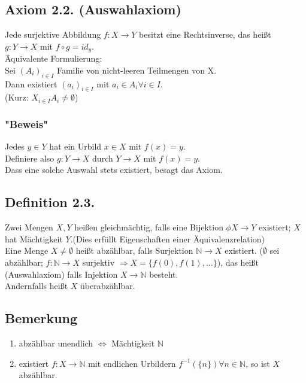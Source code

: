 \documentclass[a4paper,twoside]{article}
\begin{document}
\subsection*{Axiom 2.2. (Auswahlaxiom)}
Jede surjektive Abbildung $f: X \rightarrow Y$ besitzt eine Rechtsinverse, das heißt \\
$g: Y \rightarrow X$ mit $f \circ g = id_y$.\\
Äquivalente Formulierung:\\
Sei $(A_i)_{i \in I}$ Familie von nicht-leeren Teilmengen von X.\\
Dann existiert $(a_i)_{i \in I}$ mit $a_i \in A_i \forall i \in I$.\\
(Kurz: $X_{i \in I} A_i \neq \emptyset $)
\subsubsection*{"Beweis"}
Jedes $y \in Y$ hat ein Urbild $x \in X$ mit $f(x) = y$.\\
Definiere also $g: Y \rightarrow X$ durch $Y \rightarrow X$ mit $f(x) = y$.\\
Dass eine solche Auswahl stets existiert, besagt das Axiom.

\subsection*{Definition 2.3.}
Zwei Mengen $X,Y$ heißen gleichmächtig, falls eine Bijektion $\phi X \rightarrow Y$ existiert; $X$ hat Mächtigkeit $Y$.(Dies erfüllt Eigenschaften einer Äquivalenzrelation)\\
Eine Menge $X \neq \emptyset$ heißt abzählbar, falls Surjektion $\mathbb{N} \rightarrow X$ existiert. ($\emptyset$ sei abzählbar; $f: \mathbb{N} \rightarrow X$ surjektiv $\Rightarrow X = \{f(0), f(1), ...\}$), das heißt (Auswahlaxiom) falls  Injektion $X \rightarrow \mathbb{N}$ besteht.\\
Andernfalls heißt $X$ überabzählbar.

\subsection*{Bemerkung}
\begin{enumerate}[label=(\arabic*)]
\item abzählbar unendlich  $\Leftrightarrow$ Mächtigkeit $\mathbb{N}$
\item existiert $f: X \rightarrow \mathbb{N}$ mit endlichen Urbildern $f^{-1}(\{n\}) \forall n\in \mathbb{N}$, so ist $X$ abzählbar.
\end{enumerate}
\end{document}
